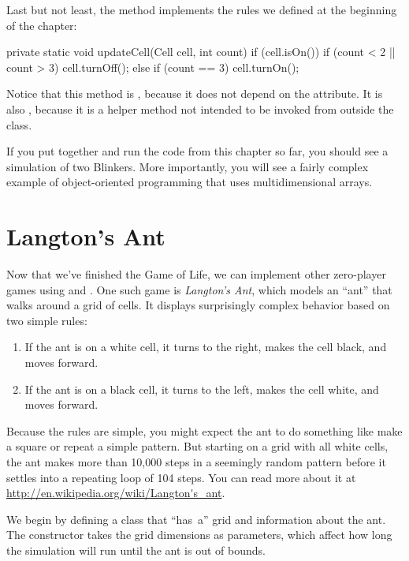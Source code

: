 Last but not least, the  method implements the rules we defined at the beginning of the chapter:

\begin{code}
private static void updateCell(Cell cell, int count) {
    if (cell.isOn()) {
        if (count < 2 || count > 3) {
            cell.turnOff();
        }
    } else {
        if (count == 3) {
            cell.turnOn();
        }
    }
}
\end{code}

Notice that this method is , because it does not depend on the  attribute.
It is also , because it is a helper method not intended to be invoked from outside the class.

If you put together and run the code from this chapter so far, you should see a simulation of two Blinkers.
More importantly, you will see a fairly complex example of object-oriented programming that uses multidimensional arrays.


\section{Langton's Ant}

Now that we've finished the Game of Life, we can implement other zero-player games using  and .
One such game is {\it Langton's Ant}, which models an ``ant'' that walks around a grid of cells.
It displays surprisingly complex behavior based on two simple rules:

\begin{enumerate}
\item If the ant is on a white cell, it turns to the right, makes the cell black, and moves forward.
\item If the ant is on a black cell, it turns to the left, makes the cell white, and moves forward.
\end{enumerate}

Because the rules are simple, you might expect the ant to do something like make a square or repeat a simple pattern.
But starting on a grid with all white cells, the ant makes more than 10,000 steps in a seemingly random pattern before it settles into a repeating loop of 104 steps.
You can read more about it at \url{http://en.wikipedia.org/wiki/Langton's_ant}.

We begin by defining a  class that ``has~a'' grid and information about the ant.
The constructor takes the grid dimensions as parameters, which affect how long the simulation will run until the ant is out of bounds.

